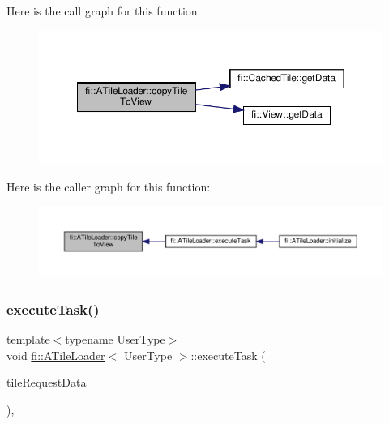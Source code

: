 Here is the call graph for this function\+:
\nopagebreak
\begin{figure}[H]
\begin{center}
\leavevmode
\includegraphics[width=350pt]{dc/d54/classfi_1_1ATileLoader_a69b1eaf0e9f636f756f514bd985a4cb5_cgraph}
\end{center}
\end{figure}
Here is the caller graph for this function\+:
\nopagebreak
\begin{figure}[H]
\begin{center}
\leavevmode
\includegraphics[width=350pt]{dc/d54/classfi_1_1ATileLoader_a69b1eaf0e9f636f756f514bd985a4cb5_icgraph}
\end{center}
\end{figure}
\mbox{\label{classfi_1_1ATileLoader_ab3fb2e90d11d160e89c6b8a7df684c7f}} 
\subsubsection{\texorpdfstring{execute\+Task()}{executeTask()}}
{\footnotesize\ttfamily template$<$typename User\+Type$>$ \\
void \hyperlink{classfi_1_1ATileLoader}{fi\+::\+A\+Tile\+Loader}$<$ User\+Type $>$\+::execute\+Task (\begin{DoxyParamCaption}\item[{std\+::shared\+\_\+ptr$<$ \hyperlink{classfi_1_1HTGSTileRequestData}{fi\+::\+H\+T\+G\+S\+Tile\+Request\+Data}$<$ User\+Type $>$$>$}]{tile\+Request\+Data }\end{DoxyParamCaption})\hspace{0.3cm}{\ttfamily [inline]}, {\ttfamily [final]}}



